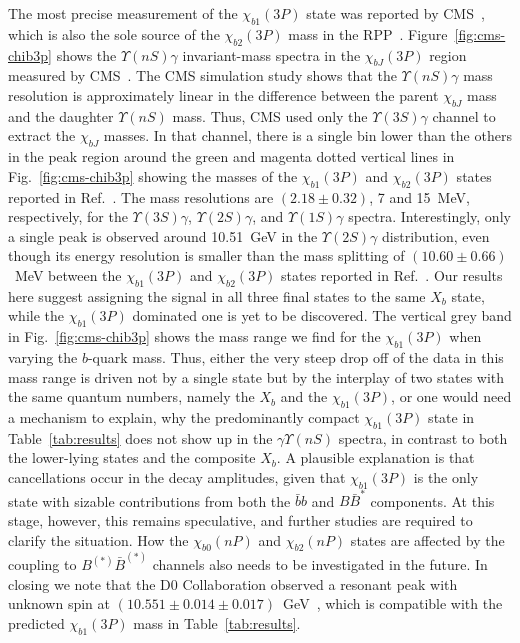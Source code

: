 \documentclass[aps,prd,showpacs,amsmath,twocolumn,superscriptaddress,floatfix,nofootinbib,notitlepage]{revtex4-2}
\newcommand{\Xb}{X_b}
\begin{document}
The most precise measurement of the $\chi_{b1}(3P)$ state was reported by CMS~\cite{CMS:2018vgf}, which is also the sole source of the $\chi_{b2}(3P)$ mass in the RPP~\cite{ParticleDataGroup:2026mpi}. 
Figure~\ref{fig:cms-chib3p} shows the $\Upsilon(nS)\gamma$ invariant-mass spectra in the $\chi_{bJ}(3P)$ region measured by CMS~\cite{CMS:2018vgf}. The CMS simulation study shows that the $\Upsilon(nS)\gamma$ mass resolution is approximately linear in the difference between the parent $\chi_{bJ}$ mass and the daughter $\Upsilon(nS)$ mass. Thus, CMS used only the $\Upsilon(3S)\gamma$ channel to extract the $\chi_{bJ}$ masses. 
In that channel, there is a single bin
lower than the others
in the peak region around the green and magenta dotted vertical lines in Fig.~\ref{fig:cms-chib3p}
showing the masses of the $\chi_{b1}(3P)$ and $\chi_{b2}(3P)$ states reported in Ref.~\cite{CMS:2018vgf}.
The mass resolutions are $(2.18\pm0.32)$, 7 and 15~MeV, respectively, for the $\Upsilon(3S)\gamma$, $\Upsilon(2S)\gamma$, and $\Upsilon(1S)\gamma$ spectra.
Interestingly, only a single peak is observed around 10.51~GeV in the $\Upsilon(2S)\gamma$ distribution, even though its energy resolution is smaller than the mass splitting of $(10.60\pm0.66)$~MeV between the $\chi_{b1}(3P)$ and $\chi_{b2}(3P)$ states reported in Ref.~\cite{CMS:2018vgf}.
Our results here suggest assigning the signal in all three final states to the same $\Xb$ state, while the $\chi_{b1}(3P)$ dominated one is yet to be discovered.
The vertical grey band in Fig.~\ref{fig:cms-chib3p} shows
the mass range we find for the $\chi_{b1}(3P)$ when varying the $b$-quark mass. Thus, either
the very steep drop off of the 
data in this mass range is driven not by a single state but by the interplay of two states with the same quantum numbers, namely
the $\Xb$ and the $\chi_{b1}(3P)$,
or one 
would need a mechanism to explain, why the predominantly compact $\chi_{b1}(3P)$ state in Table~\ref{tab:results} does not show up in the $\gamma\Upsilon(nS)$ spectra, in contrast to both the lower-lying states and the composite $\Xb$. A plausible explanation is that cancellations occur in the decay amplitudes, given that $\chi_{b1}(3P)$ is the only state with sizable contributions from both the $\bar{b}b$ and $B\bar{B}^*$ components. At this stage, however, this remains speculative, and further studies are required to clarify the situation.
How the $\chi_{b0}(nP)$ and $\chi_{b2}(nP)$ states are affected by the coupling to $B^{(*)}\bar{B}^{(*)}$ channels also needs to be investigated in the future. 
In closing we note that 
the D0 Collaboration observed a resonant peak with unknown spin at $(10.551\pm0.014\pm0.017)$~GeV~\cite{D0:2012pig}, which is compatible with the predicted $\chi_{b1}(3P)$ mass in Table~\ref{tab:results}.
\end{document}

